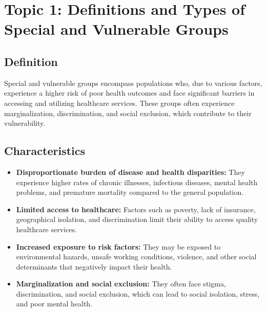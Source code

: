 \documentclass[12pt,a4paper]{article}
\begin{document}
\section*{Topic 1: Definitions and Types of Special and Vulnerable Groups}

\subsection*{Definition}
Special and vulnerable groups encompass populations who, due to various factors, experience a higher risk of poor health outcomes and face significant barriers in accessing and utilizing healthcare services. These groups often experience marginalization, discrimination, and social exclusion, which contribute to their vulnerability.

\subsection*{Characteristics}
\begin{itemize}
    \item \textbf{Disproportionate burden of disease and health disparities:} They experience higher rates of chronic illnesses, infectious diseases, mental health problems, and premature mortality compared to the general population.
    \item \textbf{Limited access to healthcare:} Factors such as poverty, lack of insurance, geographical isolation, and discrimination limit their ability to access quality healthcare services.
    \item \textbf{Increased exposure to risk factors:} They may be exposed to environmental hazards, unsafe working conditions, violence, and other social determinants that negatively impact their health.
    \item \textbf{Marginalization and social exclusion:} They often face stigma, discrimination, and social exclusion, which can lead to social isolation, stress, and poor mental health.
\end{itemize}
\end{document}
